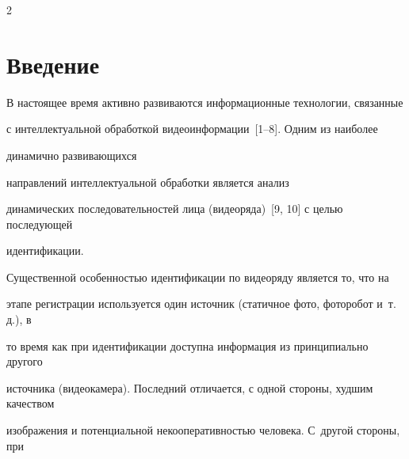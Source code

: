 









      \thispagestyle{headings}





      \begin{multicols}{2}





      \label{st\stat}








     \section{Введение}





     В настоящее время активно развиваются информационные технологии, связанные


с интеллектуальной обработкой видеоинформации~[1--8]. Одним из наиболее


динамично развивающихся\linebreak


на\-прав\-ле\-ний интеллектуальной обработки является анализ


динамических последовательностей лица (видеоряда)~[9, 10] с целью последующей


идентификации.





     Существенной особенностью идентификации по видеоряду является то, что на


этапе регистрации используется один источник (статичное фото, фоторобот и~т.\,д.), в


то время как при идентифи\-кации доступна информация из принципиально другого\linebreak


источника (видеокамера). Последний отличается, с одной стороны, худшим качеством


изоб\-ра\-же\-ния и потенциальной некооперативностью человека. С~другой стороны, при



\end{multicols}
